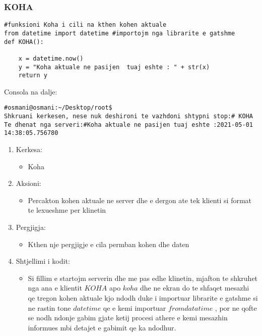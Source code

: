 \documentclass[]{article}
\begin{document}
\subsubsection{KOHA}
\begin{lstlisting}
#funksioni Koha i cili na kthen kohen aktuale
from datetime import datetime #importojm nga librarite e gatshme
def KOHA():
    
    x = datetime.now()
    y = "Koha aktuale ne pasijen  tuaj eshte : " + str(x)
    return y

\end{lstlisting}
\vspace*{1cm}
\noindent Consola na dalje:
\begin{lstlisting}
#osmani@osmani:~/Desktop/root$
Shkruani kerkesen, nese nuk deshironi te vazhdoni shtypni stop:# KOHA
Te dhenat nga serveri:#Koha aktuale ne pasijen tuaj eshte :2021-05-01 14:38:05.756780

\end{lstlisting}

\begin{enumerate}
\item Kerkesa:
\begin{itemize}
\item Koha
\end{itemize}
\item Aksioni:
\begin{itemize}
\item Percakton kohen aktuale ne server dhe e dergon ate tek klienti si format te lexueshme per klinetin
\end{itemize}
\item Pergjigja:
\begin{itemize}
\item Kthen nje pergjigje e cila permban kohen dhe daten
\end{itemize}
\item Shtjellimi i kodit:
\begin{itemize}
\item Si fillim e startojm serverin dhe me pas edhe klinetin, mjafton te shkruhet nga ana e klientit $KOHA$ apo $koha$ dhe ne ekran do te shfaqet  
mesazhi qe tregon kohen aktuale kjo ndodh duke i importuar librarite e gatshme si ne rastin tone $datetime$ qe e kemi importuar $from datatime$ 
, por ne qofte se nodh ndonje gabim gjate ketij procesi athere e kemi mesazhin informues mbi detajet e gabimit qe ka ndodhur.
\end{itemize}
\end{enumerate}
\newpage
\end{document}
